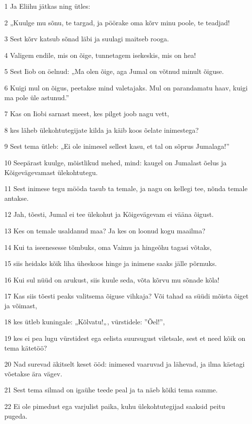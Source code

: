 \par 1 Ja Eliihu jätkas ning ütles:
\par 2 „Kuulge mu sõnu, te targad, ja pöörake oma kõrv minu poole, te teadjad!
\par 3 Sest kõrv katsub sõnad läbi ja suulagi maitseb rooga.
\par 4 Valigem endile, mis on õige, tunnetagem isekeskis, mis on hea!
\par 5 Sest Iiob on öelnud: „Ma olen õige, aga Jumal on võtnud minult õiguse.
\par 6 Kuigi mul on õigus, peetakse mind valetajaks. Mul on parandamatu haav, kuigi ma pole üle astunud.”
\par 7 Kas on Iiobi sarnast meest, kes pilget joob nagu vett,
\par 8 kes läheb ülekohtutegijate kilda ja käib koos õelate inimestega?
\par 9 Sest tema ütleb: „Ei ole inimesel sellest kasu, et tal on sõprus Jumalaga!”
\par 10 Seepärast kuulge, mõistlikud mehed, mind: kaugel on Jumalast õelus ja Kõigevägevamast ülekohtutegu.
\par 11 Sest inimese tegu mööda tasub ta temale, ja nagu on kellegi tee, nõnda temale antakse.
\par 12 Jah, tõesti, Jumal ei tee ülekohut ja Kõigevägevam ei vääna õigust.
\par 13 Kes on temale usaldanud maa? Ja kes on loonud kogu maailma?
\par 14 Kui ta iseenesesse tõmbuks, oma Vaimu ja hingeõhu tagasi võtaks,
\par 15 siis heidaks kõik liha üheskoos hinge ja inimene saaks jälle põrmuks.
\par 16 Kui sul nüüd on arukust, siis kuule seda, võta kõrvu mu sõnade kõla!
\par 17 Kas siis tõesti peaks valitsema õiguse vihkaja? Või tahad sa süüdi mõista õiget ja võimast,
\par 18 kes ütleb kuningale: „Kõlvatu!„, vürstidele: ”Õel!”,
\par 19 kes ei pea lugu vürstidest ega eelista suursugust viletsale, sest et need kõik on tema kätetöö?
\par 20 Nad surevad äkitselt keset ööd: inimesed vaaruvad ja lähevad, ja ilma käetagi võetakse ära vägev.
\par 21 Sest tema silmad on igaühe teede peal ja ta näeb kõiki tema samme.
\par 22 Ei ole pimedust ega varjulist paika, kuhu ülekohtutegijad saaksid peitu pugeda.
